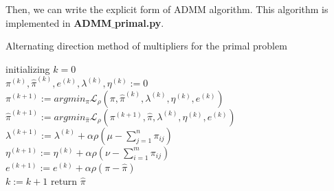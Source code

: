 \documentclass{article}
\begin{document}
Then, we can write the explicit form of ADMM algorithm. This algorithm is implemented in \textbf{ADMM$\_$primal.py}.

\begin{algorithm}[H]
  \SetAlgoNoLine
  \caption{Alternating direction method of multipliers for the primal problem} 
  initializing $k = 0$\\
  $\pi^{(k)},\hat{\pi}^{(k)},e^{(k)},\lambda^{(k)},\eta^{(k)}:=0$\\
  {  
   $\pi^{(k+1)}:=argmin_{\pi}\mathcal{L}_{\rho}(\pi,\hat{\pi}^{(k)},\lambda^{(k)},\eta^{(k)},e^{(k)})$\\
   $\hat{\pi}^{(k+1)}:=argmin_{\hat{\pi}}\mathcal{L}_{\rho}(\pi^{(k+1)},\hat{\pi},\lambda^{(k)},\eta^{(k)},e^{(k)})$\\
   $\lambda^{(k+1)}:=\lambda^{(k)}+\alpha\rho(\mu-\sum_{j=1}^{n}\pi_{ i j })$\\
   $\eta^{(k+1)}:=\eta^{(k)}+\alpha\rho(\nu-\sum_{i=1}^{m}\pi_{ i j })$\\
   $e^{(k+1)}:=e^{(k)}+\alpha\rho(\pi-\hat{\pi})$\\
   $k:= k+1$
  }
  return $\hat{\pi}$
\end{algorithm}
\end{document}
